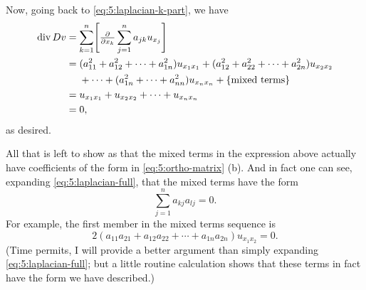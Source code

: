 \begin{solution*}
  Now, going back to \eqref{eq:5:laplacian-k-part}, we have
  \begin{equation}
    \label{eq:5:laplacian-full}
    \begin{aligned}
      \Div Dv &=\sum_{k=1}^n\Biggl[\tfrac{\partial}{\partial
        x_k}\sum_{j=1}^n
      a_{jk}u_{x_j}\Biggr]\\
      &=(a_{11}^2+a_{12}^2+\dotsb+a_{1n}^2)u_{x_1x_1}+(a_{12}^2+a_{22}^2+\dotsb+a_{2n}^2)u_{x_2x_2}\\
      &\phantom{{}={}}+\dotsb+(a_{1n}^2+\dotsb+a_{nn}^2)u_{x_nx_n}+\{\text{mixed
        terms}\}\\
      &=u_{x_1x_1}+u_{x_2x_2}+\dotsb+u_{x_nx_n}\\
      &=0,
    \end{aligned}
  \end{equation}
  as desired.

  All that is left to show as that the mixed terms in the expression above
  actually have coefficients of the form in \eqref{eq:5:ortho-matrix}
  (b). And in fact one can see, expanding \eqref{eq:5:laplacian-full}, that
  the mixed terms have the form
  \[
    \sum_{j=1}^na_{kj}a_{lj}=0.
  \]
  For example, the first member in the mixed terms sequence is
  \[
    2(a_{11}a_{21}+a_{12}a_{22}+\dotsb+a_{1n}a_{2n})u_{x_1x_2}=0.
  \]
  (Time permits, I will provide a better argument than simply expanding
  \eqref{eq:5:laplacian-full}; but a little routine calculation shows that
  these terms in fact have the form we have described.)
\end{solution*}


